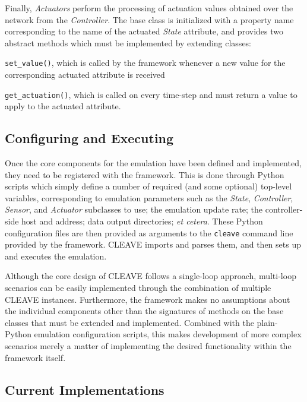\begin{description}[style=nextline]
    Finally, \emph{Actuators} perform the processing of actuation values obtained over the network from the \emph{Controller}.
    The base class is initialized with a property name corresponding to the name of the actuated \emph{State} attribute, and provides two abstract methods which must be implemented by extending classes:
    \begin{enumerate*}[itemjoin={{; }}, itemjoin*={{; and }}]
        \item \texttt{set_value()}, which is called by the framework whenever a new value for the corresponding actuated attribute is received
        \item \texttt{get_actuation()}, which is called on every time-step and must return a value to apply to the actuated attribute.
    \end{enumerate*}

\end{description}


\subsection{Configuring and Executing }

Once the core components for the emulation have been defined and implemented, they need to be registered with the framework.
This is done through Python scripts which simply define a number of required (and some optional) top-level variables, corresponding to emulation parameters such as the \emph{State}, \emph{Controller}, \emph{Sensor}, and \emph{Actuator} subclasses to use; the emulation update rate; the controller-side host and address; data output directories; \emph{et cetera}.
These Python configuration files are then provided as arguments to the \texttt{cleave} command line provided by the framework.
\ac{CLEAVE} imports and parses them, and then sets up and executes the emulation.

Although the core design of \ac{CLEAVE} follows a single-loop approach, multi-loop scenarios can be easily implemented through the combination of multiple \ac{CLEAVE} instances.
Furthermore, the framework makes no assumptions about the individual components other than the signatures of methods on the base classes that must be extended and implemented.
Combined with the plain-Python emulation configuration scripts, this makes development of more complex scenarios merely a matter of implementing the desired functionality within the framework itself.

\subsection{Current Implementations}

